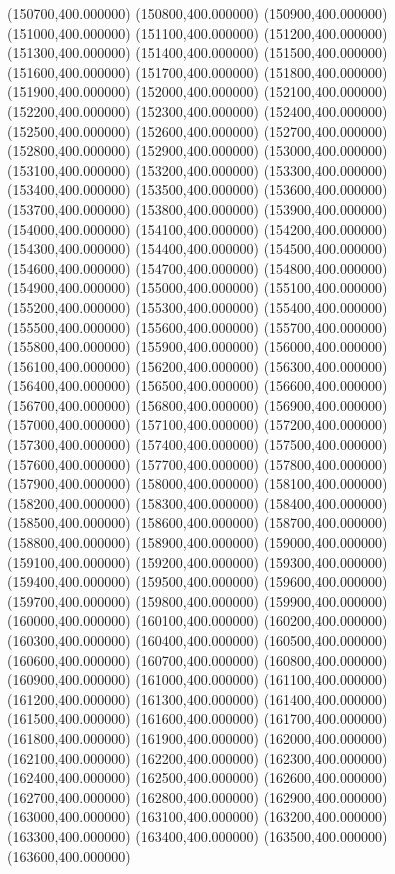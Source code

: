 (150700,400.000000)
(150800,400.000000)
(150900,400.000000)
(151000,400.000000)
(151100,400.000000)
(151200,400.000000)
(151300,400.000000)
(151400,400.000000)
(151500,400.000000)
(151600,400.000000)
(151700,400.000000)
(151800,400.000000)
(151900,400.000000)
(152000,400.000000)
(152100,400.000000)
(152200,400.000000)
(152300,400.000000)
(152400,400.000000)
(152500,400.000000)
(152600,400.000000)
(152700,400.000000)
(152800,400.000000)
(152900,400.000000)
(153000,400.000000)
(153100,400.000000)
(153200,400.000000)
(153300,400.000000)
(153400,400.000000)
(153500,400.000000)
(153600,400.000000)
(153700,400.000000)
(153800,400.000000)
(153900,400.000000)
(154000,400.000000)
(154100,400.000000)
(154200,400.000000)
(154300,400.000000)
(154400,400.000000)
(154500,400.000000)
(154600,400.000000)
(154700,400.000000)
(154800,400.000000)
(154900,400.000000)
(155000,400.000000)
(155100,400.000000)
(155200,400.000000)
(155300,400.000000)
(155400,400.000000)
(155500,400.000000)
(155600,400.000000)
(155700,400.000000)
(155800,400.000000)
(155900,400.000000)
(156000,400.000000)
(156100,400.000000)
(156200,400.000000)
(156300,400.000000)
(156400,400.000000)
(156500,400.000000)
(156600,400.000000)
(156700,400.000000)
(156800,400.000000)
(156900,400.000000)
(157000,400.000000)
(157100,400.000000)
(157200,400.000000)
(157300,400.000000)
(157400,400.000000)
(157500,400.000000)
(157600,400.000000)
(157700,400.000000)
(157800,400.000000)
(157900,400.000000)
(158000,400.000000)
(158100,400.000000)
(158200,400.000000)
(158300,400.000000)
(158400,400.000000)
(158500,400.000000)
(158600,400.000000)
(158700,400.000000)
(158800,400.000000)
(158900,400.000000)
(159000,400.000000)
(159100,400.000000)
(159200,400.000000)
(159300,400.000000)
(159400,400.000000)
(159500,400.000000)
(159600,400.000000)
(159700,400.000000)
(159800,400.000000)
(159900,400.000000)
(160000,400.000000)
(160100,400.000000)
(160200,400.000000)
(160300,400.000000)
(160400,400.000000)
(160500,400.000000)
(160600,400.000000)
(160700,400.000000)
(160800,400.000000)
(160900,400.000000)
(161000,400.000000)
(161100,400.000000)
(161200,400.000000)
(161300,400.000000)
(161400,400.000000)
(161500,400.000000)
(161600,400.000000)
(161700,400.000000)
(161800,400.000000)
(161900,400.000000)
(162000,400.000000)
(162100,400.000000)
(162200,400.000000)
(162300,400.000000)
(162400,400.000000)
(162500,400.000000)
(162600,400.000000)
(162700,400.000000)
(162800,400.000000)
(162900,400.000000)
(163000,400.000000)
(163100,400.000000)
(163200,400.000000)
(163300,400.000000)
(163400,400.000000)
(163500,400.000000)
(163600,400.000000)
